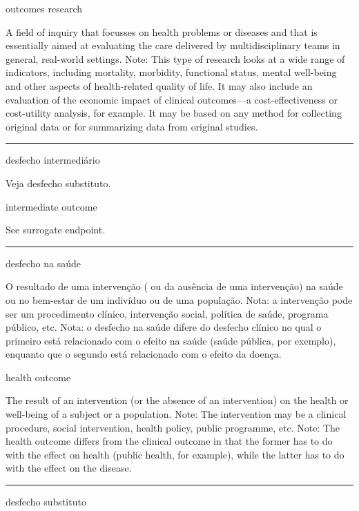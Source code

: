 \documentclass[
  openany]{book}
\begin{document}
outcomes research

A field of inquiry that focusses on health problems or diseases and that is essentially aimed at evaluating the care delivered by multidisciplinary teams in general, real-world settings. Note: This type of research looks at a wide range of indicators, including mortality, morbidity, functional status, mental well-being and other aspects of health-related quality of life. It may also include an evaluation of the economic impact of clinical outcomes---a cost-effectiveness or cost-utility analysis, for example. It may be based on any method for collecting original data or for summarizing data from original studies.

\begin{center}\rule{0.5\linewidth}{0.5pt}\end{center}

desfecho intermediário

Veja desfecho substituto.

intermediate outcome

See surrogate endpoint.

\begin{center}\rule{0.5\linewidth}{0.5pt}\end{center}

desfecho na saúde

O resultado de uma intervenção ( ou da ausência de uma intervenção) na saúde ou no bem-estar de um indivíduo ou de uma população. Nota: a intervenção pode ser um procedimento clínico, intervenção social, política de saúde, programa público, etc. Nota: o desfecho na saúde difere do desfecho clínico no qual o primeiro está relacionado com o efeito na saúde (saúde pública, por exemplo), enquanto que o segundo está relacionado com o efeito da doença.

health outcome

The result of an intervention (or the absence of an intervention) on the health or well-being of a subject or a population. Note: The intervention may be a clinical procedure, social intervention, health policy, public programme, etc. Note: The health outcome differs from the clinical outcome in that the former has to do with the effect on health (public health, for example), while the latter has to do with the effect on the disease.

\begin{center}\rule{0.5\linewidth}{0.5pt}\end{center}

desfecho substituto
\end{document}
